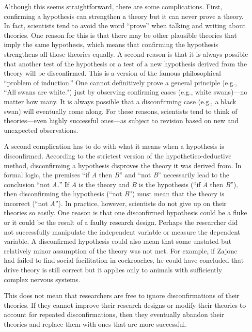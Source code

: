 \documentclass[
]{krantz}
\begin{document}
Although this seems straightforward, there are some complications. First, confirming a hypothesis can strengthen a theory but it can never prove a theory. In fact, scientists tend to avoid the word ``prove'' when talking and writing about theories. One reason for this is that there may be other plausible theories that imply the same hypothesis, which means that confirming the hypothesis strengthens all those theories equally. A second reason is that it is always possible that another test of the hypothesis or a test of a new hypothesis derived from the theory will be disconfirmed. This is a version of the famous philosophical ``problem of induction.'' One cannot definitively prove a general principle (e.g., ``All swans are white.'') just by observing confirming cases (e.g., white swans)---no matter how many. It is always possible that a disconfirming case (e.g., a black swan) will eventually come along. For these reasons, scientists tend to think of theories---even highly successful ones---as subject to revision based on new and unexpected observations.

A second complication has to do with what it means when a hypothesis is disconfirmed. According to the strictest version of the hypothetico-deductive method, disconfirming a hypothesis disproves the theory it was derived from. In formal logic, the premises ``if \emph{A} then \emph{B}'' and ``not \emph{B}'' necessarily lead to the conclusion ``not \emph{A.}'' If \emph{A} is the theory and \emph{B} is the hypothesis (``if \emph{A} then \emph{B}''), then disconfirming the hypothesis (``not \emph{B}'') must mean that the theory is incorrect (``not \emph{A}''). In practice, however, scientists do not give up on their theories so easily. One reason is that one disconfirmed hypothesis could be a fluke or it could be the result of a faulty research design. Perhaps the researcher did not successfully manipulate the independent variable or measure the dependent variable. A disconfirmed hypothesis could also mean that some unstated but relatively minor assumption of the theory was not met. For example, if Zajonc had failed to find social facilitation in cockroaches, he could have concluded that drive theory is still correct but it applies only to animals with sufficiently complex nervous systems.

This does not mean that researchers are free to ignore disconfirmations of their theories. If they cannot improve their research designs or modify their theories to account for repeated disconfirmations, then they eventually abandon their theories and replace them with ones that are more successful.
\end{document}
